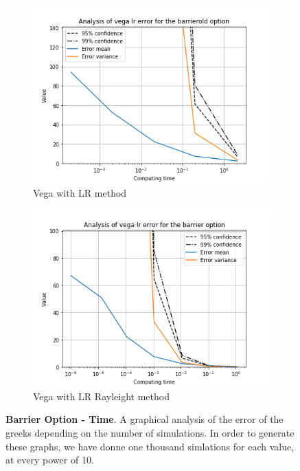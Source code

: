 \documentclass[11pt,a4paper,fleqn]{article}
\begin{document}
\begin{figure}[h!]
      \begin{subfigure}[b]{0.45\textwidth}
          \includegraphics[width=\textwidth]{graphs/barrieroldvegalrtime.png}
          \caption{Vega with LR method}
      \end{subfigure}
      \begin{subfigure}[b]{0.45\textwidth}
          \includegraphics[width=\textwidth]{graphs/barriervegalrtime.png}
          \caption{Vega with LR Rayleight method}
      \end{subfigure}

      \caption{\textbf{Barrier Option - Time}. A graphical analysis of the error of the greeks depending on the number of simulations. In order to generate these graphs, we have donne one thousand simlations for each value, at every power of 10.}
\end{figure}
\end{document}
